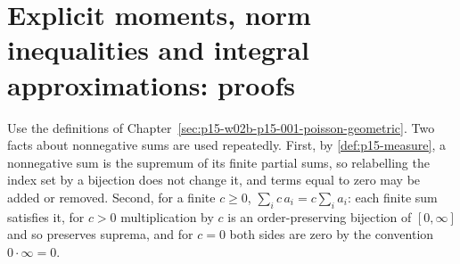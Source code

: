 \section{Explicit moments, norm inequalities and integral approximations: proofs}
\label{sec:annex-p15-w02b-p15-001-poisson-geometric}

Use the definitions of
Chapter~\ref{sec:p15-w02b-p15-001-poisson-geometric}. Two facts about
nonnegative sums are used repeatedly. First, by
\cref{def:p15-measure}, a nonnegative sum is the supremum of its
finite partial sums, so relabelling the index set by a bijection does
not change it, and terms equal to zero may be added or removed.
Second, for a finite \(c\geq0\),
\(\sum_ic\,a_i=c\sum_ia_i\): each finite sum satisfies it, for
\(c>0\) multiplication by \(c\) is an order-preserving bijection of
\([0,\infty]\) and so preserves suprema, and for \(c=0\) both sides
are zero by the convention \(0\cdot\infty=0\).

